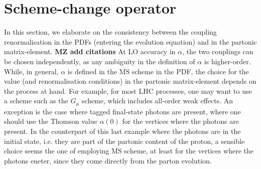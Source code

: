 \section{Scheme-change operator}
\label{sec:scheme-change-operator}

In this section, we elaborate on the consistency between the coupling renormalisation in the PDFs (entering the evolution equation) and in 
the partonic matrix-element. {\bf MZ add citations}
At LO accuracy in $\alpha$, the two couplings can be chosen independently, as any ambiguity in the definition of $\alpha$  is higher-order.
While, in general, $\alpha$ is defined in the $\overline{\textrm{MS}}$ scheme in the PDF, the choice for the value (and renormalisation conditions)
in the partonic matrix-element depends on the process at hand. For example, for most LHC processes, 
one may want to use a scheme such as the $G_\mu$ scheme, which includes all-order weak effects. An exception is the case where tagged final-state
photons are present, where one should use the Thomson value $\alpha(0)$ for the vertices where the photons are present. In the counterpart
of this last example where the photons are in the initial state, i.e. they are part of the partonic content of the proton, a sensible choice 
seems the one of employing $\overline{\textrm{MS}}$ scheme, at least for the vertices where the photons eneter, since they come 
directly from the parton evolution.\\


